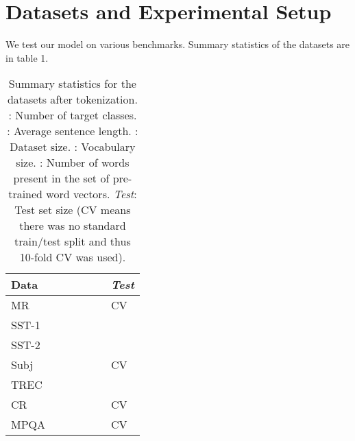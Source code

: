 \documentclass[11pt]{article}
\begin{document}
\section{Datasets and Experimental Setup}
We test our model on various benchmarks. Summary statistics of the datasets are in table 1.
\begin{table}
\center
\begin{tabular}{ >{\centering\arraybackslash}m{1cm} || >{\centering\arraybackslash}m{0.15cm} | >{\centering\arraybackslash}m{0.25cm} | >{\centering\arraybackslash}m{0.825cm} | >{\centering\arraybackslash}m{0.825cm} | >{\centering\arraybackslash}m{0.825cm} | >{\centering\arraybackslash}m{0.8cm} }
\hline
\textbf{Data} &  &  &  &  &  & \emph{Test} \\ \hline
MR &  &  &  &   &  & CV \\ 
SST-1 &   &  &   &   &  &  \\ 
SST-2 &   &  &   &   &  &  \\ 
Subj &  &  &  & &  & CV \\
TREC &  &  &  &  &  &  \\ 
CR &   &  &  &   &  & CV \\
MPQA &  &  &   &  &   & CV \\ \hline
\end{tabular}
\caption{Summary statistics for the datasets after tokenization. : Number of target classes. : Average sentence length. : Dataset size. : Vocabulary size. : Number of words present in the set of pre-trained word vectors. \emph{Test}: Test set size (CV means there was no standard train/test split and thus 10-fold CV was used).}
\end{table}
\end{document}
